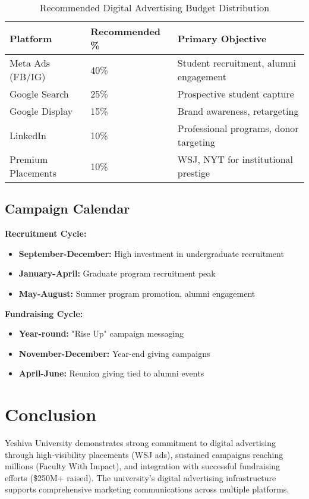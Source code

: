 \documentclass[12pt,letterpaper]{article}
\begin{document}
\begin{table}[h]
\centering
\begin{tabular}{@{}lll@{}}
\toprule
\textbf{Platform} & \textbf{Recommended \%} & \textbf{Primary Objective} \\
\midrule
Meta Ads (FB/IG) & 40\% & Student recruitment, alumni engagement \\
Google Search & 25\% & Prospective student capture \\
Google Display & 15\% & Brand awareness, retargeting \\
LinkedIn & 10\% & Professional programs, donor targeting \\
Premium Placements & 10\% & WSJ, NYT for institutional prestige \\
\bottomrule
\end{tabular}
\caption{Recommended Digital Advertising Budget Distribution}
\end{table}

\subsection{Campaign Calendar}

\textbf{Recruitment Cycle:}
\begin{itemize}[leftmargin=*]
    \item \textbf{September-December:} High investment in undergraduate recruitment
    \item \textbf{January-April:} Graduate program recruitment peak
    \item \textbf{May-August:} Summer program promotion, alumni engagement
\end{itemize}

\textbf{Fundraising Cycle:}
\begin{itemize}[leftmargin=*]
    \item \textbf{Year-round:} "Rise Up" campaign messaging
    \item \textbf{November-December:} Year-end giving campaigns
    \item \textbf{April-June:} Reunion giving tied to alumni events
\end{itemize}

\section{Conclusion}

Yeshiva University demonstrates strong commitment to digital advertising through high-visibility placements (WSJ ads), sustained campaigns reaching millions (Faculty With Impact), and integration with successful fundraising efforts (\$250M+ raised). The university's digital advertising infrastructure supports comprehensive marketing communications across multiple platforms.
\end{document}
